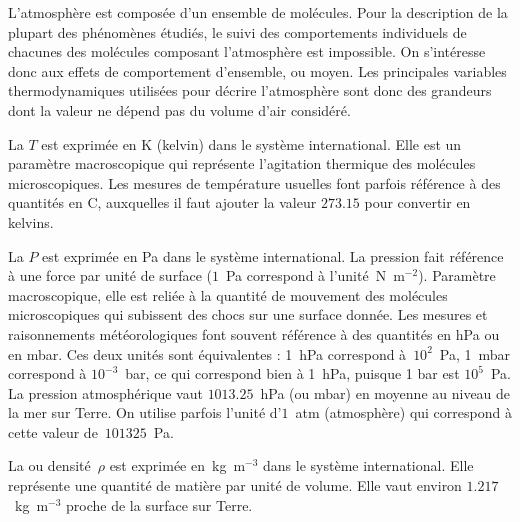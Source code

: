 \sk
L'atmosphère est composée d'un ensemble de molécules. Pour la description de la plupart des phénomènes étudiés, le suivi des comportements individuels de chacunes des molécules composant l'atmosphère est impossible. On s'intéresse donc aux effets de comportement d'ensemble, ou moyen. Les principales variables thermodynamiques utilisées pour décrire l'atmosphère sont donc des grandeurs  dont la valeur ne dépend pas du volume d'air considéré.
\begin{finger}
\item La  $T$ est exprimée en K (kelvin) dans le système international. Elle est un paramètre macroscopique qui représente l'agitation thermique des molécules microscopiques. Les mesures de température usuelles font parfois référence à des quantités en \deg C, auxquelles il faut ajouter la valeur $273.15$ pour convertir en kelvins.
\item La  $P$ est exprimée en Pa dans le système international. La pression fait référence à une force par unité de surface ($1$~Pa correspond à l'unité~N~m$^{-2}$). Paramètre macroscopique, elle est reliée à la quantité de mouvement des molécules microscopiques qui subissent des chocs sur une surface donnée. Les mesures et raisonnements météorologiques font souvent référence à des quantités en hPa ou en mbar. Ces deux unités sont équivalentes : 1~hPa correspond à~$10^{2}$~Pa, 1~mbar correspond à $10^{-3}$~bar, ce qui correspond bien à 1~hPa, puisque 1 bar est $10^{5}$~Pa. La pression atmosphérique vaut $1013.25$~hPa (ou mbar) en moyenne au niveau de la mer sur Terre. On utilise parfois l'unité d'$1$~atm (atmosphère) qui correspond à cette valeur de~$101325$~Pa.
\item La  ou densité~$\rho$ est exprimée en~kg~m$^{-3}$ dans le système international. Elle représente une quantité de matière par unité de volume. Elle vaut environ $1.217$~kg~m$^{-3}$ proche de la surface sur Terre.
\end{finger}
